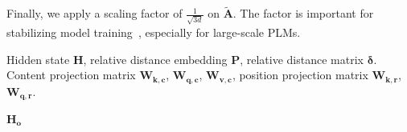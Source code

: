 Finally, we apply a scaling factor of $\frac{1}{\sqrt{3d}}$ on $\bm{\tilde{A}}$.
The factor is important for stabilizing model training~\citep{vaswani2017attention}, especially for large-scale PLMs. 


\begin{algorithm}[H]
\caption{Disentangled Attention}
\label{DA}
 \begin{algorithmic}[1]
    \INPUT Hidden state $\bm{H}$, relative distance embedding $\bm{P}$, relative distance matrix $\bm{\delta}$.
    Content projection matrix $\bm{W_{k,c}}$, $\bm{W_{q,c}}$, $\bm{W_{v,c}}$,
    position projection matrix $\bm{W_{k,r}}$, $\bm{W_{q,r}}$. 

    \EndFor
        \EndFor
    \EndFor
    \EndFor
        \EndFor
    \EndFor
    \OUTPUT $\bm{H_o}$
 \end{algorithmic}

\end{algorithm}
